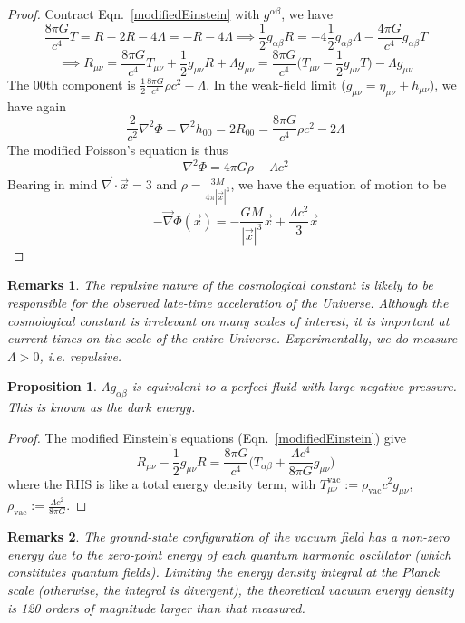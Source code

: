 \documentclass[a4paper]{article}
\newtheorem{remarks}{Remarks}[section]
\theoremstyle{new}
\newtheorem{prop}{Proposition}[section]
\begin{document}
\begin{proof}
Contract Eqn.~\ref{modifiedEinstein} with $g^{\alpha\beta}$, we have
$$\frac{8\pi G}{c^4}T=R-2R-4\Lambda=-R-4\Lambda\implies\frac{1}{2}g_{\alpha\beta}R=-4\frac{1}{2}g_{\alpha\beta}\Lambda-\frac{4\pi G}{c^4}g_{\alpha\beta}T$$
\begin{equation}
\implies R_{\mu\nu}=\frac{8\pi G}{c^4}T_{\mu\nu}+\frac{1}{2}g_{\mu\nu}R+\Lambda g_{\mu\nu}=\frac{8\pi G}{c^4}\bigg(T_{\mu\nu}-\frac{1}{2}g_{\mu\nu}T\bigg)-\Lambda g_{\mu\nu}\label{modifiedEinstein2}
\end{equation}
The 00th component is $\frac{1}{2}\frac{8\pi G}{c^4}\rho c^2-\Lambda$. 
In the weak-field limit ($g_{\mu\nu}=\eta_{\mu\nu}+h_{\mu\nu}$), we have again 
$$\frac{2}{c^2}\nabla^2\Phi=\nabla^2h_{00}=2R_{00}=\frac{8\pi G}{c^4}\rho c^2-2\Lambda$$
The modified Poisson's equation is thus
\begin{equation}
\nabla^2\Phi=4\pi G\rho-\Lambda c^2\label{modifiedPoisson}
\end{equation}
Bearing in mind $\vec{\nabla}\cdot\vec{x}=3$ and $\rho=\frac{3M}{4\pi|\vec{x}|^3}$, we have the equation of motion to be
$$-\vec{\nabla}\Phi(\vec{x})=-\frac{GM}{|\vec{x}|^3}\vec{x}+\frac{\Lambda c^2}{3}\vec{x}$$
\end{proof}
\begin{remarks}
The repulsive nature of the cosmological constant is likely to be responsible for the observed late-time acceleration of the Universe. Although the cosmological constant is irrelevant on many scales of interest, it is important at current times on the scale of the entire Universe. Experimentally, we do measure $\Lambda>0$, i.e. repulsive.
\end{remarks}
\begin{prop}
$\Lambda g_{\alpha\beta}$ is equivalent to a perfect fluid with large negative pressure. This is known as the dark energy.
\end{prop}
\begin{proof}
The modified Einstein's equations (Eqn.~\ref{modifiedEinstein}) give
$$R_{\mu\nu}-\frac{1}{2}g_{\mu\nu}R=\frac{8\pi G}{c^4}\bigg(T_{\alpha\beta}+\frac{\Lambda c^4}{8\pi G}g_{\mu\nu}\bigg)$$
where the RHS is like a total energy density term, with $T_{\mu\nu}^{\text{vac}}:=\rho_{\text{vac}}c^2g_{\mu\nu}$, $\rho_{\text{vac}}:=\frac{\Lambda c^2}{8\pi G}$.
\end{proof}
\begin{remarks}
The ground-state configuration of the vacuum field has a non-zero energy due to the zero-point energy of each quantum harmonic oscillator (which constitutes quantum fields). Limiting the energy density integral at the Planck scale (otherwise, the integral is divergent), the theoretical vacuum energy density is 120 orders of magnitude larger than that measured.
\end{remarks}
\end{document}

